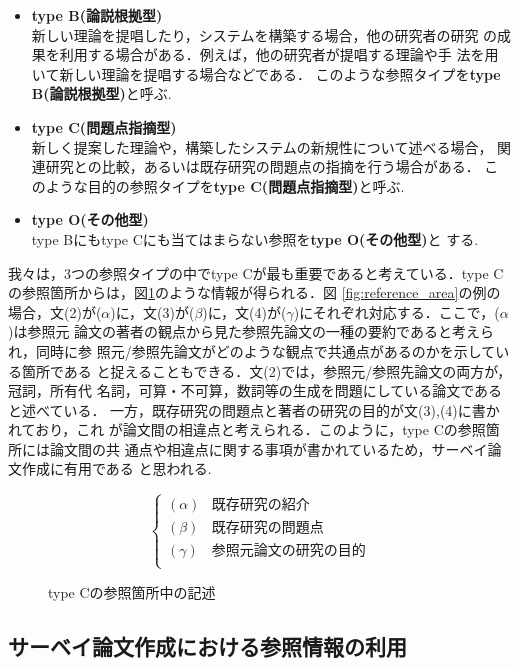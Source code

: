 \begin{itemize}
 \item {\bf type B(論説根拠型)}\\
       新しい理論を提唱したり，システムを構築する場合，他の研究者の研究
       の成果を利用する場合がある．例えば，他の研究者が提唱する理論や手
       法を用いて新しい理論を提唱する場合などである．
       このような参照タイプを{\bf type B(論説根拠型)}と呼ぶ.
 \item {\bf type C(問題点指摘型)}\\
       新しく提案した理論や，構築したシステムの新規性について述べる場合，
       関連研究との比較，あるいは既存研究の問題点の指摘を行う場合がある．
       このような目的の参照タイプを{\bf type C(問題点指摘型)}と呼ぶ.
 \item {\bf type O(その他型)}\\
       type Bにもtype Cにも当てはまらない参照を{\bf type O(その他型)}と
       する.
\end{itemize}

\vspace{0.3cm}

我々は，3つの参照タイプの中でtype Cが最も重要であると考えている．type C
の参照箇所からは，図\ref{fig:C-type_refer}のような情報が得られる．図
\ref{fig:reference_area}の例の場合，文(2)が($\alpha $)に，文(3)が($\beta
$)に，文(4)が($\gamma $)にそれぞれ対応する．ここで，($\alpha $)は参照元
論文の著者の観点から見た参照先論文の一種の要約であると考えられ，同時に参
照元/参照先論文がどのような観点で共通点があるのかを示している箇所である
と捉えることもできる．文(2)では，参照元/参照先論文の両方が，冠詞，所有代
名詞，可算・不可算，数詞等の生成を問題にしている論文であると述べている．
一方，既存研究の問題点と著者の研究の目的が文(3),(4)に書かれており，これ
が論文間の相違点と考えられる．このように，type Cの参照箇所には論文間の共
通点や相違点に関する事項が書かれているため，サーベイ論文作成に有用である
と思われる.

       
\begin{figure}[t]
 \[
 \left\{ 
 \begin{array}{ll}
  (\alpha ) & 既存研究の紹介 \\
  (\beta ) & 既存研究の問題点 \\
  (\gamma ) & 参照元論文の研究の目的 \\
 \end{array}
 \right.
\]
\caption{type Cの参照箇所中の記述\label{fig:C-type_refer}}
\end{figure}


\subsection{サーベイ論文作成における参照情報の利用}


